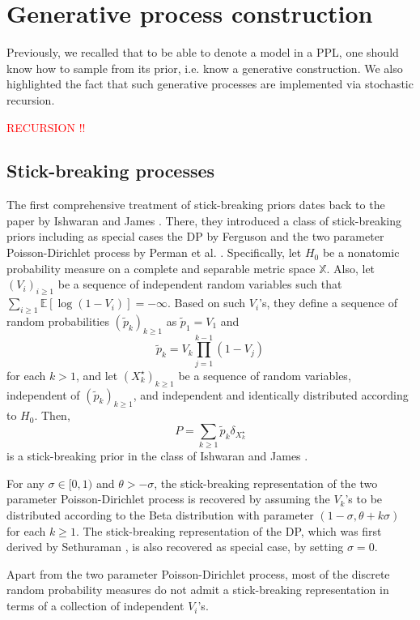\section{Generative process construction} \label{SBS}
Previously, we recalled that to be able to denote a model in a \gls{PPL}, one should know how to sample from its prior, i.e. know a generative construction.
We also highlighted the fact that such generative processes are implemented via stochastic recursion.

\textcolor{red}{RECURSION !!}


\subsection{Stick-breaking processes}

The first comprehensive treatment of stick-breaking priors dates back to the paper by Ishwaran and James \cite{Ishwaran:2001dw}. There, they introduced a class of stick-breaking priors including as special cases the \acrlong{DP} by Ferguson \cite{ferguson73} and the two parameter Poisson-Dirichlet process by Perman et al. \cite{Perman:1992ke}. Specifically, let $H_0$ be a nonatomic probability measure on a complete and separable metric space $\mathbb{X}$.
Also, let $(V_i)_{i \ge 1}$ be a sequence of independent random variables such that $\sum_{i \ge 1}{\mathbb{E}[\log(1 - V_i)]} = - \infty$.
Based on such $V_i$'s, they define a sequence of random probabilities $(\tilde{p}_k)_{k \ge 1}$ as $\tilde{p}_1 = V_1$ and
$$ \tilde{p}_k = V_k \prod_{j=1}^{k-1}{(1-V_j)} $$
for each $k > 1$, and let $(X^\star_k)_{k \ge 1}$ be a sequence of random variables, independent
of $(\tilde{p}_k)_{k \ge 1}$, and independent and identically distributed according to $H_0$. Then,
$$ P = \sum_{k \ge 1}{\tilde{p}_k \delta_{X_k^\star}} $$
is a stick-breaking prior in the class of Ishwaran and James \cite{Ishwaran:2001dw}.

For any $\sigma \in [0,1)$ and $\theta > -\sigma$, the stick-breaking representation of the two parameter Poisson-Dirichlet process is recovered by assuming the $V_k$'s to be distributed according to the Beta distribution with parameter $(1 - \sigma, \theta + k\sigma)$ for each $k \ge 1$.
The stick-breaking representation of the \gls{DP}, which was first derived by Sethuraman \cite{sethuraman94}, is also recovered as special case, by setting $\sigma = 0$.

Apart from the two parameter Poisson-Dirichlet process, most of the discrete random probability measures do not admit a stick-breaking representation in terms of a collection of independent $V_i$'s.%

